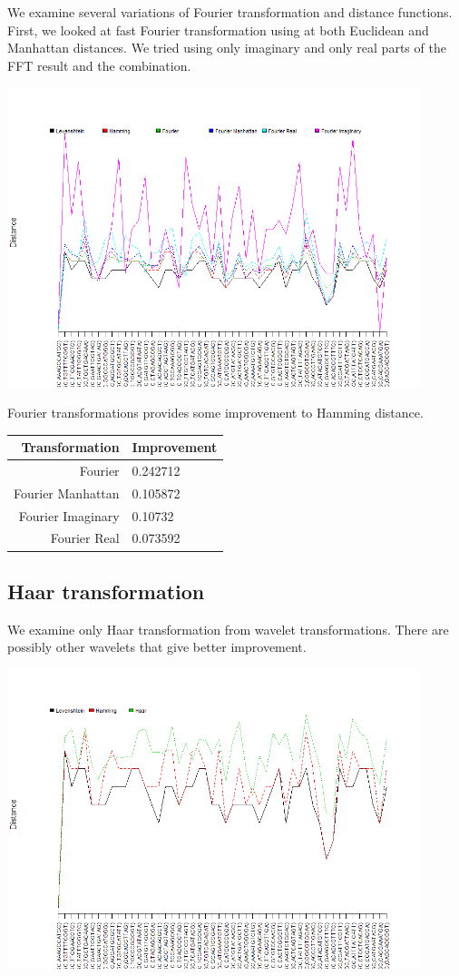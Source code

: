\documentclass [12pt, a4]{article} %
\begin{document}
We examine several variations of Fourier transformation and distance functions. First, we looked at fast Fourier transformation using at both Euclidean and Manhattan distances. We tried using only imaginary and only real parts of the FFT result and the combination.

\includegraphics[width=0.9\textwidth]{img/fourier.png}

Fourier transformations provides some improvement to Hamming distance.

\begin{tabular}{ r | l }
    Transformation & Improvement \\ \hline
    Fourier           & 0.242712 \\
    Fourier Manhattan & 0.105872 \\
    Fourier Imaginary & 0.10732 \\
    Fourier Real      & 0.073592 \\
\end{tabular}

\subsection{Haar transformation}

We examine only Haar transformation from wavelet transformations. There are possibly other wavelets that give better improvement.

\includegraphics[width=0.9\textwidth]{img/haar.png}
\end{document}
